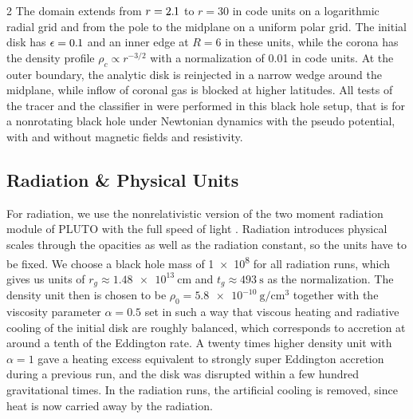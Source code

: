 \begin{multicols}{2}
	The domain extends from $r = 2.{\kern-0.5pt}1$ to $r = 30$ in code units on a logarithmic radial grid and from the pole to the
	midplane on a uniform polar grid. The initial disk has $\epsilon = 0.{\kern-0.5pt}1$ and an inner edge at $R = 6$ in these units, while
	the corona has the density profile $\rho_c \propto r^{-3/2}$ with a normalization of \num{0.01} in code units. At the
	outer boundary, the analytic disk is reinjected in a narrow wedge around the midplane, while inflow of coronal gas is
	blocked at higher latitudes. All tests of the tracer and the classifier in  were performed in this
	black hole setup, that is for a nonrotating black hole under Newtonian dynamics with the pseudo potential, with and without
	magnetic fields and resistivity.

	\subsection{Radiation \& Physical Units}

	For radiation, we use the nonrelativistic version of the two moment radiation module of PLUTO with the full speed of light
	\cite{melo2019, melo2021}. Radiation introduces physical scales through the opacities as well as the radiation constant, so
	the units have to be fixed. We choose a black hole mass of \qty{1e8}{\solarmass} for all radiation runs, which gives us units of
	$r_g \approx \qty{1.48e13}{\centi\meter}$ and $t_g \approx \qty{493}{\second}$ as the normalization. The density unit then is chosen
	to be $\rho_0 = \qty{5.8e-10}{\gram\per\centi\meter\cubed}$ together with the viscosity parameter $\alpha = 0.5$ set in such a way that
	viscous heating and radiative cooling of the initial disk are roughly balanced, which corresponds to accretion at around a tenth of
	the Eddington rate. A twenty times higher density unit with $\alpha = 1$ gave a heating excess equivalent to strongly super Eddington
	accretion during a previous run, and the disk was disrupted within a few hundred gravitational times. In the radiation runs, the
	artificial cooling is removed, since heat is now carried away by the radiation.


\end{multicols}
